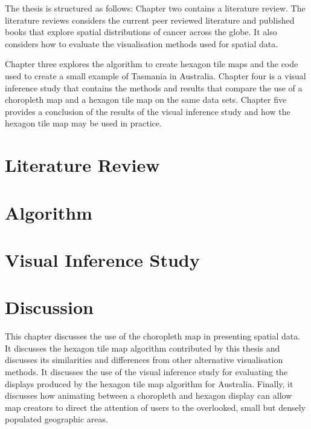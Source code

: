 \documentclass{monashthesis}
\begin{document}
The thesis is structured as follows: Chapter two contains a literature review.
The literature reviews considers the current peer reviewed literature and published books that explore spatial distributions of cancer across the globe.
It also considers how to evaluate the visualisation methods used for spatial data.

Chapter three explores the algorithm to create hexagon tile maps and the code used to create a small example of Tasmania in Australia.
Chapter four is a visual inference study that contains the methods and results that compare the use of a choropleth map and a hexagon tile map on the same data sets.
Chapter five provides a conclusion of the results of the visual inference study and how the hexagon tile map may be used in practice.

\hypertarget{ch:literature}{%
\chapter{Literature Review}\label{ch:literature}}





\hypertarget{ch:algorithm}{%
\chapter{Algorithm}\label{ch:algorithm}}





\hypertarget{ch:experiment}{%
\chapter{Visual Inference Study}\label{ch:experiment}}





\hypertarget{ch:discussion}{%
\chapter{Discussion}\label{ch:discussion}}

This chapter discusses the use of the choropleth map in presenting spatial data.
It discusses the hexagon tile map algorithm contributed by this thesis and discusses its similarities and differences from other alternative visualisation methods.
It discusses the use of the visual inference study for evaluating the displays produced by the hexagon tile map algorithm for Australia. Finally, it discusses how animating between a choropleth and hexagon display can allow map creators to direct the attention of users to the overlooked, small but densely populated geographic areas.
\end{document}
